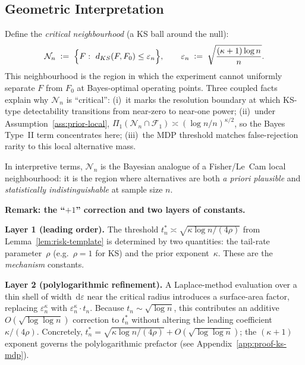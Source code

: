 \documentclass[11pt]{article}
\newcommand{\defeq}{\mathrel{\mathop:}=}
\newcommand{\calF}{\mathcal{F}}
\newcommand{\calN}{\mathcal{N}}
\newcommand{\rhotail}{\rho}  %
\newcommand{\diff}{\,\mathrm{d}}
\newcommand{\1}{\mathbf{1}}
\theoremstyle{plain}
\theoremstyle{definition}
\theoremstyle{remark}
\begin{document}
\subsection{Geometric Interpretation}\label{subsec:geom-interpretation}

Define the \emph{critical neighbourhood} (a KS ball around the null):
\begin{equation}\label{eq:critical-neighbourhood}
\calN_n
\;\defeq\;
\Bigl\{F:\ d_{KS}(F,F_0)\le \varepsilon_n\Bigr\},
\qquad
\varepsilon_n
\;\defeq\;
\sqrt{\frac{(\kappa+1)\log n}{n}}.
\end{equation}
This neighbourhood is the region in which the experiment cannot uniformly separate $F$ from $F_0$ at Bayes-optimal operating points.
Three coupled facts explain why $\calN_n$ is ``critical'':
(i)~it marks the resolution boundary at which KS-type detectability transitions from near-zero to near-one power;
(ii)~under Assumption~\ref{ass:prior-local}, $\Pi_1(\calN_n\cap\calF_1) \asymp (\log n/n)^{\kappa/2}$, so the Bayes Type~II term concentrates here;
(iii)~the MDP threshold matches false-rejection rarity to this local alternative mass.

In interpretive terms, $\calN_n$ is the Bayesian analogue of a Fisher/Le~Cam local neighbourhood: it is the region where alternatives are both \emph{a priori plausible} and \emph{statistically indistinguishable} at sample size $n$.

%
\begin{mdframed}[style=principleframe]
\noindent\textbf{Remark: the ``$+1$'' correction and two layers of constants.}

\smallskip\noindent
\textbf{Layer 1 (leading order).}
The threshold $t_n^{*} \asymp \sqrt{\kappa\log n/(4\rhotail)}$ from Lemma~\ref{lem:risk-template} is determined by two quantities: the tail-rate parameter~$\rhotail$ (e.g.\ $\rhotail=1$ for KS) and the prior exponent~$\kappa$.
These are the \emph{mechanism} constants.

\smallskip\noindent
\textbf{Layer 2 (polylogarithmic refinement).}
A Laplace-method evaluation over a thin shell of width $\diff\varepsilon$ near the critical radius introduces a surface-area factor, replacing $\varepsilon_n^{\kappa}$ with $\varepsilon_n^{\kappa}\cdot t_n$.
Because $t_n\sim\sqrt{\log n}$, this contributes an additive $O(\sqrt{\log\log n})$ correction to $t_n^{*}$ without altering the leading coefficient $\kappa/(4\rhotail)$.
Concretely, $t_n^{*} = \sqrt{\kappa\log n/(4\rhotail)} + O(\sqrt{\log\log n})$; the $(\kappa+1)$ exponent governs the polylogarithmic prefactor (see Appendix~\ref{app:proof-ks-mdp}).
\end{mdframed}
\end{document}
